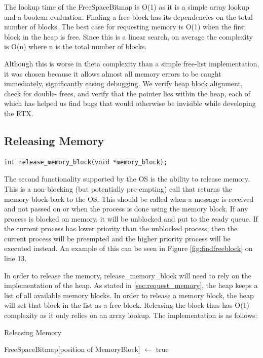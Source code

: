 \documentclass[12pt]{report}
\begin{document}
The lookup time of the FreeSpaceBitmap is O(1) as it is a simple array lookup and a boolean evaluation. Finding a free block has its dependencies on the total number of blocks. The best case for requesting memory is O(1) when the first block in the heap is free. Since this is a linear search, on average the complexity is O(n) where n is the total number of blocks.

Although this is worse in theta complexity than a simple free-list implementation,
it was chosen because it allows almost all memory errors to be caught immediately,
significantly easing debugging. We verify heap block alignment, check for double-
frees, and verify that the pointer lies within the heap, each of which has helped
us find bugs that would otherwise be invisible while developing the RTX.

\bigskip

\subsection{Releasing Memory}
\begin{lstlisting}
int release_memory_block(void *memory_block);
\end{lstlisting}

\par The second functionality supported by the OS is the ability to release memory. This is a non-blocking (but potentially pre-empting) call that returns the memory block back to the OS. This should be called when a message is received and not passed on or when the process is done using the memory block. If any process is blocked on memory, it will be unblocked and put to the ready queue. If the current process has lower priority than the unblocked process, then the current process will be preempted and the higher priority process will be executed instead. An example of this can be seen in Figure \ref{fig:findfreeblock} on line 13.

\par In order to release the memory, release\_memory\_block will need to rely on the implementation of the heap. As stated in \ref{sec:request_memory}, the heap keeps a list of all available memory blocks. In order to release a memory block, the heap will set that block in the list as a free block. Releasing the block thus has O(1) complexity as it only relies on an array lookup. The implementation is as follows:
\begin{algorithm}
    \caption{Releasing Memory}
    \begin{algorithmic}[1]
      \State FreeSpaceBitmap[position of MemoryBlock] $\gets$ true
    \EndFunction
  \end{algorithmic}
\end{algorithm}
\end{document}
